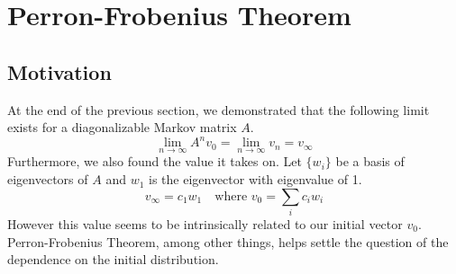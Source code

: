 \documentclass[10pt]{article}
\begin{document}
\section{Perron-Frobenius Theorem}
\subsection{Motivation}
At the end of the previous section, we demonstrated that the following limit exists for a diagonalizable Markov matrix $A$.
\[\lim_{n\rightarrow\infty} A^nv_0 = \lim_{n\rightarrow\infty} v_n = v_\infty\]
Furthermore, we also found the value it takes on. Let $\{w_i\}$ be a basis of eigenvectors of $A$ and $w_1$ is the eigenvector with eigenvalue of 1.
\[v_\infty = c_1 w_1\quad\text{where } v_0 = \sum_{i}c_i w_i \]
However this value seems to be intrinsically related to our initial vector $v_0$. Perron-Frobenius Theorem, among other things, helps settle the question of the dependence on the initial distribution.
\end{document}
